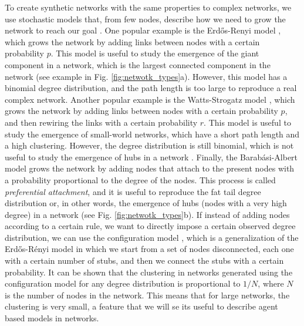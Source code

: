 To create synthetic networks with the same properties to complex networks, we use stochastic models that, from few nodes, describe how we need to grow the network to reach our goal \cite{posfai2016network}. One popular example is the Erd\H{o}s-Renyi model \cite{erdos1960evolution}, which grows the network by adding links between nodes with a certain probability $p$. This model is useful to study the emergence of the giant component in a network, which is the largest connected component in the network (see example in Fig. \ref{fig:netwotk_types}a). However, this model has a binomial degree distribution, and the path length is too large to reproduce a real complex network. Another popular example is the Watts-Strogatz model \cite{watts1998collective}, which grows the network by adding links between nodes with a certain probability $p$, and then rewiring the links with a certain probability $r$. This model is useful to study the emergence of small-world networks, which have a short path length and a high clustering. However, the degree distribution is still binomial, which is not useful to study the emergence of hubs in a network \cite{newman2003structure}. Finally, the Barab\'asi-Albert model \cite{barabasi1999emergence} grows the network by adding nodes that attach to the present nodes with a probability proportional to the degree of the nodes. This process is called \textit{preferential attachment}, and it is useful to reproduce the fat tail degree distribution or, in other words, the emergence of hubs (nodes with a very high degree) in a network (see Fig. \ref{fig:netwotk_types}b). If instead of adding nodes according to a certain rule, we want to directly impose a certain observed degree distribution, we can use the configuration model \cite{newman-book}, which is a generalization of the Erd\H{o}s-R\'enyi model in which we start from a set of nodes disconnected, each one with a certain number of stubs, and then we connect the stubs with a certain probability. It can be shown that the clustering in networks generated using the configuration model for any degree distribution is proportional to $1/N$, where $N$ is the number of nodes in the network. This means that for large networks, the clustering is very small, a feature that we will se its useful to describe agent based models in networks.

